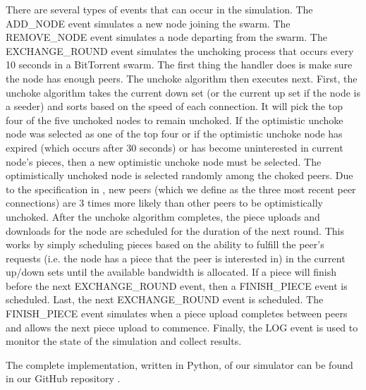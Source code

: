 There are several types of events that can occur in the simulation. The ADD\_NODE event simulates a new
node joining the swarm.  The REMOVE\_NODE event simulates a node departing
from the swarm. The EXCHANGE\_ROUND event simulates the unchoking process
that occurs every 10 seconds in a BitTorrent swarm. The first thing the
handler does is make sure the node has enough peers. The unchoke algorithm
then executes next. First, the unchoke algorithm takes the current down
set (or the current up set if the node is a seeder) and sorts based on
the speed of each connection.  It will pick the top four of the 
five unchoked nodes to remain unchoked. If the optimistic unchoke node
was selected as one of the top four or if the optimistic unchoke node
has expired (which occurs after 30 seconds) or has become uninterested
in current node's pieces, then a new optimistic unchoke node must be
selected. The optimistically unchoked node is selected randomly among
the choked peers. Due to the specification in \cite{bep003}, new peers
(which we define as the three most recent peer connections) are 3 times
more likely than other peers to be optimistically unchoked.  After the
unchoke algorithm completes, the piece uploads and downloads for the node
are scheduled for the duration of the next round. This works by simply
scheduling pieces based on the ability to fulfill the peer's requests
(i.e. the node has a piece that the peer is interested in) in the current
up/down sets until the available bandwidth is allocated. If a piece
will finish before the next EXCHANGE\_ROUND event, then a FINISH\_PIECE
event is scheduled. Last, the next EXCHANGE\_ROUND event is scheduled.
The FINISH\_PIECE event simulates when a piece upload completes between
peers and allows the next piece upload to commence. Finally, the LOG event is
used to monitor the state of the simulation and collect results.

The complete implementation, written in Python, of our simulator can be found in our GitHub repository \cite{github}.
